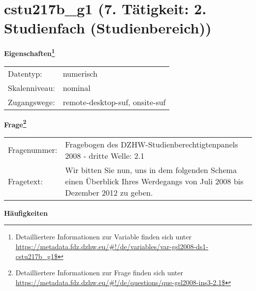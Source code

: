 
    \setcounter{footnote}{0}

    \vspace*{-1.8cm}
	\section{cstu217b\_g1 (7. Tätigkeit: 2. Studienfach (Studienbereich))}
	\label{section:cstu217b_g1}



    \vspace*{0.5cm}
    \noindent\textbf{Eigenschaften\footnote{Detailliertere Informationen zur Variable finden sich unter
		\url{https://metadata.fdz.dzhw.eu/\#!/de/variables/var-gsl2008-ds1-cstu217b_g1$}}}\\
	\begin{tabularx}{\hsize}{@{}lX}
	Datentyp: & numerisch \\
	Skalenniveau: & nominal \\
	Zugangswege: &
	  remote-desktop-suf, 
	  onsite-suf
 \\
    \end{tabularx}



				\vspace*{0.5cm}
                \noindent\textbf{Frage\footnote{Detailliertere Informationen zur Frage finden sich unter
		              \url{https://metadata.fdz.dzhw.eu/\#!/de/questions/que-gsl2008-ins3-2.1$}}}\\
				\begin{tabularx}{\hsize}{@{}lX}
					Fragenummer: &
					  Fragebogen des DZHW-Studienberechtigtenpanels 2008 - dritte Welle:
					  2.1
 \\
					Fragetext: & Wir bitten Sie nun, uns in dem folgenden Schema einen Überblick Ihres Werdegangs von Juli 2008 bis Dezember 2012 zu geben. \\
				\end{tabularx}





        		\vspace*{0.5cm}
                \noindent\textbf{Häufigkeiten}

